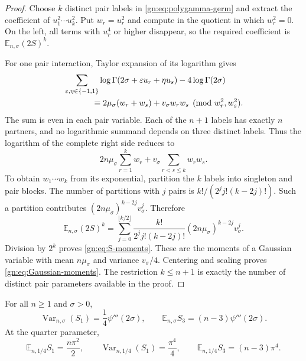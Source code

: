\begin{proof}
Choose $k$ distinct pair labels in \eqref{gn:eq:polygamma-germ} and
extract the coefficient of $u_1^2\cdots u_k^2$.  Put $w_r=u_r^2$ and
compute in the quotient in which $w_r^2=0$.  On the left, all terms
with $u_r^4$ or higher disappear, so the required coefficient is
$\mathbb E_{n,\sigma}(2S)^k$.

For one pair interaction, Taylor expansion of its logarithm gives
\begin{align*}
 &\sum_{\varepsilon,\eta\in\{-1,1\}}
      \log\Gamma(2\sigma+\varepsilon u_r+\eta u_s)
                       -4\log\Gamma(2\sigma)\\
 &\hspace{12mm}\equiv
          2\mu_\sigma(w_r+w_s)+v_\sigma w_rw_s
                              \pmod{w_r^2,w_s^2}.
\end{align*}
The sum is even in each pair variable.  Each of the $n+1$ labels has
exactly $n$ partners, and no logarithmic summand depends on three
distinct labels.  Thus the logarithm of the complete right side reduces
to
\[
       2n\mu_\sigma\sum_{r=1}^kw_r
                  +v_\sigma\sum_{r<s\le k}w_rw_s.
\]
To obtain $w_1\cdots w_k$ from its exponential, partition the $k$
labels into singleton and pair blocks.  The number of partitions with
$j$ pairs is $k!/(2^jj!(k-2j)!)$.  Such a partition contributes
$(2n\mu_\sigma)^{k-2j}v_\sigma^j$.  Therefore
\[
 \mathbb E_{n,\sigma}(2S)^k
 =\sum_{j=0}^{\lfloor k/2\rfloor}
   \frac{k!}{2^jj!(k-2j)!}
       (2n\mu_\sigma)^{k-2j}v_\sigma^j.
\]
Division by $2^k$ proves \eqref{gn:eq:S-moments}.  These are the
moments of a Gaussian variable with mean $n\mu_\sigma$ and variance
$v_\sigma/4$.  Centering and scaling proves
\eqref{gn:eq:Gaussian-moments}.  The restriction $k\le n+1$ is exactly
the number of distinct pair parameters available in the proof.
\end{proof}

\begin{corollary}
\label{gn:cor:variance}
For all $n\ge1$ and $\sigma>0$,
\begin{equation}\label{gn:eq:variance}
 \operatorname{Var}_{n,\sigma}(S_1)=\frac14\psi'''(2\sigma),
 \qquad
 \mathbb E_{n,\sigma}S_3=(n-3)\psi'''(2\sigma).
\end{equation}
At the quarter parameter,
\begin{equation}\label{gn:eq:quarter-statistics}
 \mathbb E_{n,1/4}S_1=\frac{n\pi^2}{2},\qquad
 \operatorname{Var}_{n,1/4}(S_1)=\frac{\pi^4}{4},\qquad
 \mathbb E_{n,1/4}S_3=(n-3)\pi^4.
\end{equation}
\end{corollary}

